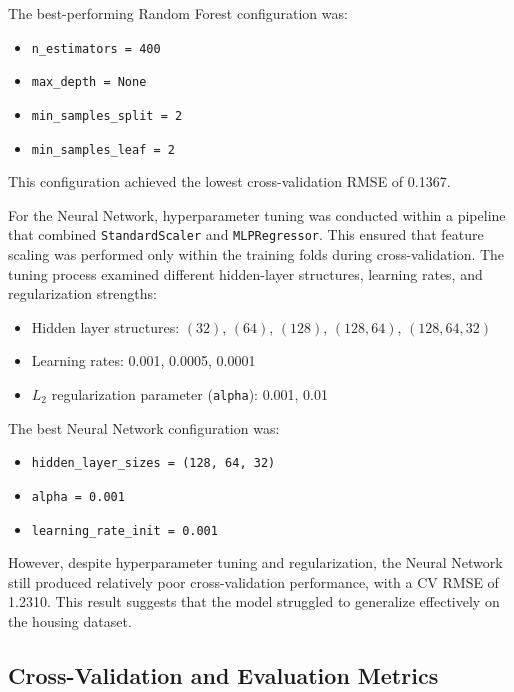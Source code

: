 \documentclass[12pt,a4paper,oneside,openany]{book}
\begin{document}
The best-performing Random Forest configuration was:

\begin{itemize}
    \item \texttt{n\_estimators = 400}
    \item \texttt{max\_depth = None}
    \item \texttt{min\_samples\_split = 2}
    \item \texttt{min\_samples\_leaf = 2}
\end{itemize}

This configuration achieved the lowest cross-validation RMSE of 0.1367.

For the Neural Network, hyperparameter tuning was conducted within a pipeline that combined \texttt{StandardScaler} and \texttt{MLPRegressor}. This ensured that feature scaling was performed only within the training folds during cross-validation. The tuning process examined different hidden-layer structures, learning rates, and regularization strengths:

\begin{itemize}
    \item Hidden layer structures: $(32)$, $(64)$, $(128)$, $(128,64)$, $(128,64,32)$
    \item Learning rates: 0.001, 0.0005, 0.0001
    \item $L_2$ regularization parameter (\texttt{alpha}): 0.001, 0.01
\end{itemize}

The best Neural Network configuration was:

\begin{itemize}
    \item \texttt{hidden\_layer\_sizes = (128, 64, 32)}
    \item \texttt{alpha = 0.001}
    \item \texttt{learning\_rate\_init = 0.001}
\end{itemize}

However, despite hyperparameter tuning and regularization, the Neural Network still produced relatively poor cross-validation performance, with a CV RMSE of 1.2310. This result suggests that the model struggled to generalize effectively on the housing dataset.

\subsection{Cross-Validation and Evaluation Metrics}
\end{document}
